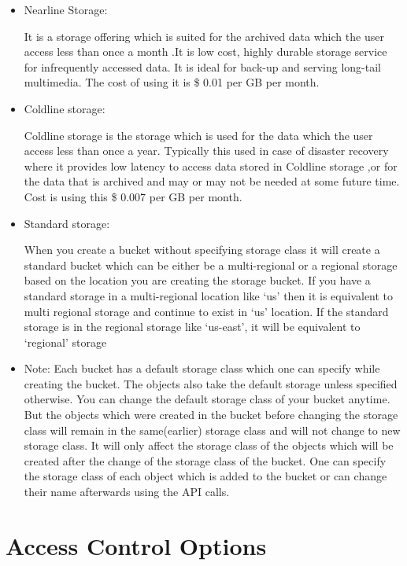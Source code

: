 \documentclass[9pt,twocolumn,twoside]{styles/osajnl}
\begin{document}
\begin{itemize}
\begin{itemize}
		\end{itemize}

\item Nearline Storage:

It is a storage offering which is suited for the archived data which the user access less than once a month .It is low cost, highly durable storage service for infrequently accessed data. It is ideal for back-up and serving long-tail multimedia. The cost of using it is \$ 0.01 per GB per month. 


\item Coldline storage:

Coldline storage is the storage which is used for the data which the user access less than once a year. Typically this used in case of disaster recovery where it provides low latency to access  data stored in Coldline storage ,or for the data that is archived and may or may not be needed at some future time. Cost is using this \$  0.007 per GB per month.


\item Standard storage: 

When you create a bucket without specifying storage class it will create a standard bucket which can be either be a multi-regional or a regional storage based on the location  you are creating the storage bucket. If you have a standard storage in a multi-regional location like ‘us’ then it is equivalent to multi regional storage and continue to exist in ‘us’ location. If the standard storage is in the regional storage like ‘us-east’, it will be equivalent to ‘regional’ storage 


\item Note:
Each bucket has a default storage class which one can specify while creating the bucket. The objects also take the default storage unless specified otherwise. You can change the default storage class of your bucket anytime. But the objects which were created in the bucket before changing the storage class will remain in the same(earlier) storage class and will not change to new storage class. It will only affect the storage class of the objects which will be created after the change of the storage class of the bucket.
One can specify the storage class of each object which is added to the bucket or can change their name afterwards using the API calls. 

\end{itemize}



\section{Access Control Options}
\end{document}
